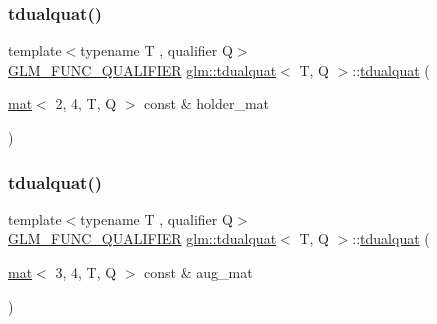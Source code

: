 \mbox{\label{structglm_1_1tdualquat_aaf58d434e56496978c027c3b7c021cfb}} 
\subsubsection{\texorpdfstring{tdualquat()}{tdualquat()}\hspace{0.1cm}{\footnotesize\ttfamily [8/11]}}
{\footnotesize\ttfamily template$<$typename T , qualifier Q$>$ \\
\mbox{\hyperlink{setup_8hpp_a33fdea6f91c5f834105f7415e2a64407}{G\+L\+M\+\_\+\+F\+U\+N\+C\+\_\+\+Q\+U\+A\+L\+I\+F\+I\+ER}} \mbox{\hyperlink{structglm_1_1tdualquat}{glm\+::tdualquat}}$<$ T, Q $>$\+::\mbox{\hyperlink{structglm_1_1tdualquat}{tdualquat}} (\begin{DoxyParamCaption}\item[{\mbox{\hyperlink{structglm_1_1mat}{mat}}$<$ 2, 4, T, Q $>$ const \&}]{holder\+\_\+mat }\end{DoxyParamCaption})}

\mbox{\label{structglm_1_1tdualquat_a3f557639a4737d4852919fdbbb39e133}} 
\subsubsection{\texorpdfstring{tdualquat()}{tdualquat()}\hspace{0.1cm}{\footnotesize\ttfamily [9/11]}}
{\footnotesize\ttfamily template$<$typename T , qualifier Q$>$ \\
\mbox{\hyperlink{setup_8hpp_a33fdea6f91c5f834105f7415e2a64407}{G\+L\+M\+\_\+\+F\+U\+N\+C\+\_\+\+Q\+U\+A\+L\+I\+F\+I\+ER}} \mbox{\hyperlink{structglm_1_1tdualquat}{glm\+::tdualquat}}$<$ T, Q $>$\+::\mbox{\hyperlink{structglm_1_1tdualquat}{tdualquat}} (\begin{DoxyParamCaption}\item[{\mbox{\hyperlink{structglm_1_1mat}{mat}}$<$ 3, 4, T, Q $>$ const \&}]{aug\+\_\+mat }\end{DoxyParamCaption})}

\mbox{\label{structglm_1_1tdualquat_a9dbf71289809c7b43527c0e881601fbb}} 
